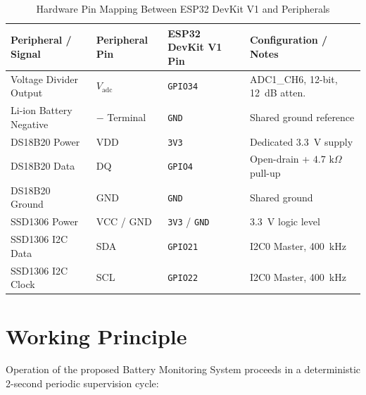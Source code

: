 \documentclass[12pt,a4paper]{article}
\begin{document}
\begin{table}[H]
\centering
\caption{Hardware Pin Mapping Between ESP32 DevKit V1 and Peripherals}
\label{tab:pin_map}
\renewcommand{\arraystretch}{1.2}
\begin{tabular}{@{}llll@{}}
\toprule
\textbf{Peripheral / Signal} & \textbf{Peripheral Pin} & \textbf{ESP32 DevKit V1 Pin} & \textbf{Configuration / Notes} \\
\midrule
Voltage Divider Output & $V_{\text{adc}}$ & \texttt{GPIO34} & ADC1\_CH6, 12-bit, 12~dB atten. \\
Li-ion Battery Negative & $-$ Terminal & \texttt{GND} & Shared ground reference \\
DS18B20 Power & VDD & \texttt{3V3} & Dedicated 3.3~V supply \\
DS18B20 Data & DQ & \texttt{GPIO4} & Open-drain + $4.7\text{ k}\Omega$ pull-up \\
DS18B20 Ground & GND & \texttt{GND} & Shared ground \\
SSD1306 Power & VCC / GND & \texttt{3V3} / \texttt{GND} & 3.3~V logic level \\
SSD1306 I2C Data & SDA & \texttt{GPIO21} & I2C0 Master, 400~kHz \\
SSD1306 I2C Clock & SCL & \texttt{GPIO22} & I2C0 Master, 400~kHz \\
\bottomrule
\end{tabular}
\end{table}

\section{Working Principle}
\label{sec:working_principle}

Operation of the proposed Battery Monitoring System proceeds in a deterministic 2-second periodic supervision cycle:
\end{document}
